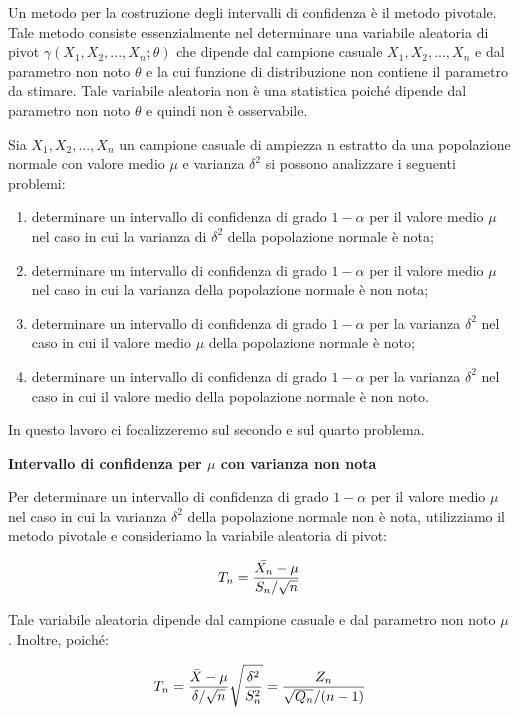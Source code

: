 Un metodo per la costruzione degli intervalli di confidenza è il metodo pivotale. Tale metodo consiste essenzialmente nel determinare una variabile aleatoria di pivot $\gamma(X_1, X_2, ..., X_n;\theta)$ che dipende dal campione casuale $X_1, X_2, ..., X_n$ e dal parametro non noto $\theta$ e la cui funzione di distribuzione non contiene il parametro da stimare. Tale variabile aleatoria non è una statistica poiché dipende dal parametro non noto $\theta$ e quindi non è osservabile.

Sia $X_1, X_2, ..., X_n$ un campione casuale di ampiezza n estratto da una popolazione normale con valore medio $\mu$ e varianza $\delta^2$ si possono analizzare i seguenti problemi:

\begin{enumerate}
    \item determinare un intervallo di confidenza di grado $1 - \alpha$ per il valore medio $\mu$ nel caso in cui la varianza di $\delta^2$ della popolazione normale è nota;
    \item determinare un intervallo di confidenza di grado $1 - \alpha$ per il valore medio $\mu$ nel caso in cui la varianza della popolazione normale è non nota;
    \item determinare un intervallo di confidenza di grado $1 - \alpha$ per la varianza $\delta^2$ nel caso in cui il valore medio $\mu$ della popolazione normale è noto;
    \item determinare un intervallo di confidenza di grado $1 - \alpha$ per la varianza $\delta^2$ nel caso in cui il valore medio della popolazione normale è non noto.
\end{enumerate}

In questo lavoro ci focalizzeremo sul secondo e sul quarto problema.

\vspace{5mm}
\noindent \textbf{Intervallo di confidenza per $\mu$ con varianza non nota}

Per determinare un intervallo di confidenza di grado $1-\alpha$ per il valore medio $\mu$ nel caso in cui la varianza $\delta^2$ della popolazione normale non è nota, utilizziamo il metodo pivotale e consideriamo la variabile aleatoria di pivot:

\[T_n = \frac{\Bar{X_n} - \mu}{S_n/\sqrt{n}}\]

Tale variabile aleatoria dipende dal campione casuale e dal parametro non noto $\mu$. Inoltre, poiché:

\[T_n = \frac{\Bar{X} - \mu}{\delta / \sqrt{n}}\sqrt{\frac{\delta^2}{S_n^2}} = \frac{Z_n}{\sqrt{Q_n}/(n-1)}\]

